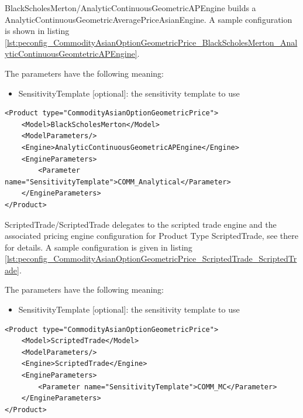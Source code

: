 BlackScholesMerton/AnalyticContinuousGeometricAPEngine builds a AnalyticContinuousGeometricAveragePriceAsianEngine. A sample
configuration is shown in listing
\ref{lst:peconfig_CommodityAsianOptionGeometricPrice_BlackScholesMerton_AnalyticContinuousGeomtetricAPEngine}.

The parameters have the following meaning:

\begin{itemize}
\item SensitivityTemplate [optional]: the sensitivity template to use
\end{itemize}

\begin{longlisting}
\begin{verbatim}
<Product type="CommodityAsianOptionGeometricPrice">
    <Model>BlackScholesMerton</Model>
    <ModelParameters/>
    <Engine>AnalyticContinuousGeometricAPEngine</Engine>
    <EngineParameters>
        <Parameter name="SensitivityTemplate">COMM_Analytical</Parameter>
    </EngineParameters>
</Product>
\end{verbatim}
\caption{Configuration for Product CommodityAsianOptionGeometricPrice, Model BlackScholesMerton, Engine AnalyticContinuousGeomtetricAPEngine}
\label{lst:peconfig_CommodityAsianOptionGeometricPrice_BlackScholesMerton_AnalyticContinuousGeomtetricAPEngine}
\end{longlisting}

ScriptedTrade/ScriptedTrade delegates to the scripted trade engine and the associated pricing engine configuration for
Product Type ScriptedTrade, see there for details. A sample configuration is given in listing
\ref{lst:peconfig_CommodityAsianOptionGeometricPrice_ScriptedTrade_ScriptedTrade}.

The parameters have the following meaning:

\begin{itemize}
\item SensitivityTemplate [optional]: the sensitivity template to use
\end{itemize}

\begin{longlisting}
\begin{verbatim}
<Product type="CommodityAsianOptionGeometricPrice">
    <Model>ScriptedTrade</Model>
    <ModelParameters/>
    <Engine>ScriptedTrade</Engine>
    <EngineParameters>
        <Parameter name="SensitivityTemplate">COMM_MC</Parameter>
    </EngineParameters>
</Product>
\end{verbatim}
\caption{Configuration for Product CommodityAsianOptionGeometricPrice, Model ScriptedTrade, Engine ScriptedTrade}
\label{lst:peconfig_CommodityAsianOptionGeometricPrice_ScriptedTrade_ScriptedTrade}
\end{longlisting}

